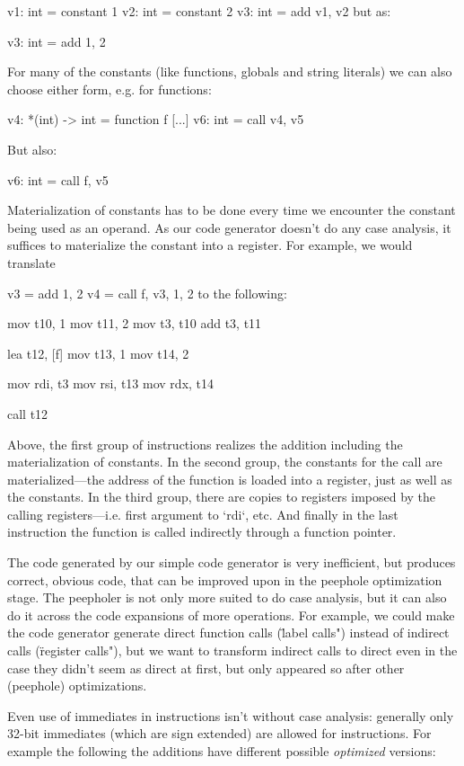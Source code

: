 \begtt
v1: int = constant 1
v2: int = constant 2
v3: int = add v1, v2
\endtt
%
but as:

\begtt
v3: int = add 1, 2
\endtt

For many of the constants (like functions, globals and string literals) we can
also choose either form, e.g. for functions:

\begtt
v4: *(int) -> int = function f
[...]
v6: int = call v4, v5
\endtt

But also:

\begtt
v6: int = call f, v5
\endtt

Materialization of constants has to be done every time we encounter the constant
being used as an operand. As our code generator doesn't do any case analysis, it
suffices to materialize the constant into a register. For example, we would
translate

\begtt
v3 = add 1, 2
v4 = call f, v3, 1, 2
\endtt
%
to the following:

\begtt
mov t10, 1
mov t11, 2
mov t3, t10
add t3, t11

lea t12, [f]
mov t13, 1
mov t14, 2

mov rdi, t3
mov rsi, t13
mov rdx, t14

call t12
\endtt

Above, the first group of instructions realizes the addition including the
materialization of constants. In the second group, the constants for the call
are materialized---the address of the function is loaded into a register, just
as well as the constants. In the third group, there are copies to registers imposed by the
calling registers---i.e. first argument to `rdi`, etc. And finally in the last
instruction the function is called indirectly through a function pointer.

The code generated by our simple code generator is very inefficient, but
produces correct, obvious code, that can be improved upon in the peephole
optimization stage. The peepholer is not only more suited to do case analysis,
but it can also do it across the code expansions of more operations. For
example, we could make the code generator generate direct function calls
(\"label calls") instead of indirect calls (\"register calls"), but we want to
transform indirect calls to direct even in the case they didn't seem as direct
at first, but only appeared so after other (peephole) optimizations.

Even use of immediates in instructions isn't without case analysis: generally
only 32-bit immediates (which are sign extended) are allowed for instructions.
For example the following the additions have different possible {\em optimized}
versions:

